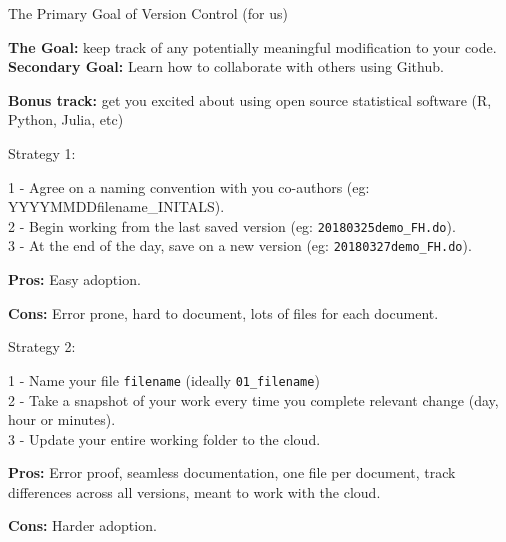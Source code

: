 \documentclass[ignorenonframetext,]{beamer}
\begin{document}
\begin{frame}{The Primary Goal of Version Control (for us)}
\protect\hypertarget{the-primary-goal-of-version-control-for-us}{}

\textbf{The Goal:} keep track of any potentially meaningful modification
to your code.\\
\pause   \textbf{Secondary Goal:} Learn how to collaborate with others
using Github.

\pause

\textbf{Bonus track:} get you excited about using open source
statistical software (R, Python, Julia, etc)

\end{frame}

\begin{frame}[fragile]{Strategy 1:}
\protect\hypertarget{strategy-1}{}

1 - Agree on a naming convention with you co-authors (eg:
YYYYMMDDfilename\_INITALS).\\
2 - Begin working from the last saved version (eg:
\texttt{20180325demo\_FH.do}).\\
3 - At the end of the day, save on a new version (eg:
\texttt{20180327demo\_FH.do}).

\textbf{Pros:} Easy adoption.

\textbf{Cons:} Error prone, hard to document, lots of files for each
document.

\end{frame}

\begin{frame}[fragile]{Strategy 2:}
\protect\hypertarget{strategy-2}{}

1 - Name your file \texttt{filename} (ideally \texttt{01\_filename})\\
2 - Take a snapshot of your work every time you complete relevant change
(day, hour or minutes).\\
3 - Update your entire working folder to the cloud.

\textbf{Pros:} Error proof, seamless documentation, one file per
document, track differences across all versions, meant to work with the
cloud.

\textbf{Cons:} Harder adoption.

\end{frame}
\end{document}
